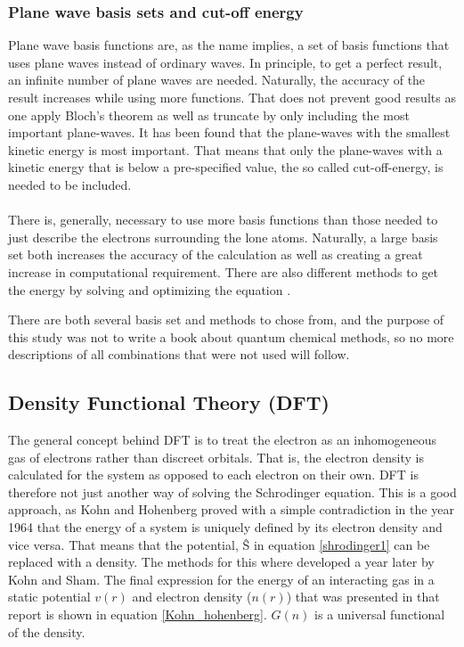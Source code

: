 \documentclass[12pt,a4paper]{article}
\begin{document}
\subsubsection{Plane wave basis sets and cut-off energy}
Plane wave basis functions are, as the name implies, a set of basis functions that uses plane waves instead of ordinary waves. In principle, to get a perfect result, an infinite number of plane waves are needed. Naturally, the accuracy of the result increases while using more functions. That does not prevent good results as one apply Bloch's theorem as well as truncate by only including the most important plane-waves. It has been found that the plane-waves with the smallest kinetic energy is most important. That means that only the plane-waves with a kinetic energy that is below a pre-specified value, the so called cut-off-energy, is needed to be included. 

\paragraph*{}
There is, generally, necessary to use more basis functions than those needed to just describe the electrons surrounding the lone atoms. Naturally, a large basis set both increases the accuracy of the calculation as well as creating a great increase in computational requirement.  There are also different methods to get the energy by solving and optimizing the equation \cite{computionalprimer}.

There are both several basis set and methods to chose from, and the purpose of this study was not to write a book about quantum chemical methods, so no more descriptions of all combinations that were not used will follow.

\subsection{Density Functional Theory (DFT)}
The general concept behind DFT is to treat the electron as an inhomogeneous gas of electrons rather than discreet orbitals. That is, the electron density is calculated for the system as opposed to each electron on their own. DFT is therefore not just another way of solving the Schrodinger equation. \cite{burke} This is a good approach, as Kohn and Hohenberg proved with a simple contradiction  in the year 1964 that the energy of a system is uniquely defined by its electron density and vice versa.  That means that the potential, \^{S} in equation \ref{shrodinger1} can be replaced with a density. The methods for this where developed a year later by Kohn and Sham. The final expression for the energy of an interacting gas in a static potential $v(r)$ and electron density ($n(r)$) that was presented in that report is shown in equation \ref{Kohn_hohenberg}. $G(n)$ is a universal functional of the density.   
\end{document}
